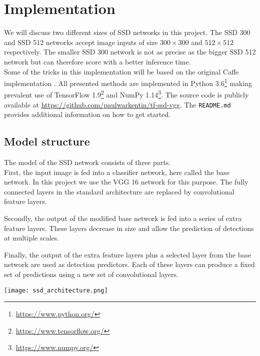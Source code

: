 
\section{Implementation}
\label{section:implementation}

We will discuss two different sizes of SSD networks in this project. The SSD 300 and SSD 512 networks accept image inputs of size $300 \times 300$ and $512 \times 512$ respectively. The smaller SSD 300 network is not as precise as the bigger SSD 512 network but can therefore score with a better inference time. \\

Some of the tricks in this implementation will be based on the original Caffe implementation \cite{ssdcfgit}. All presented methods are implemented in Python 3.6\footnote{\url{https://www.python.org/}} making prevalent use of TensorFlow 1.9\footnote{\url{https://www.tensorflow.org/}} and NumPy 1.14\footnote{\url{https://www.numpy.org/}}. The source code is publicly available at \url{https://github.com/paulwarkentin/tf-ssd-vgg}. The \texttt{README.md} provides additional information on how to get started.

\subsection{Model structure}

The model of the SSD network consists of three parts. \\

First, the input image is fed into a classifier network, here called the base network. In this project we use the VGG 16 network for this purpose. The fully connected layers in the standard architecture are replaced by convolutional feature layers.

Secondly, the output of the modified base network is fed into a series of extra feature layers. These layers decrease in size and allow the prediction of detections at multiple scales.

Finally, the output of the extra feature layers plus a selected layer from the base network are used as detection predictors. Each of these layers can produce a fixed set of predictions using a new set of convolutional layers.

\begin{center}
  \texttt{[image: ssd\_architecture.png]}
\end{center}

